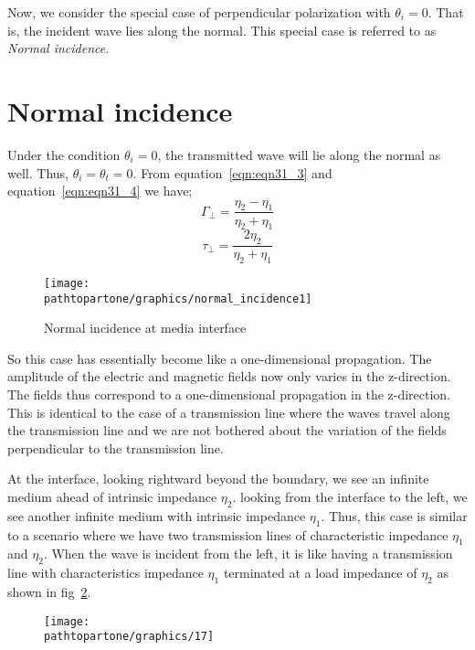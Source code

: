 Now, we consider the special case of perpendicular polarization with  $\theta_{i} = 0$. That is, the incident wave lies along the normal. This special case is referred to as \emph{Normal incidence}.

\section{Normal incidence} 

Under the condition $\theta_{i} = 0$, the transmitted wave will lie along the normal as well. Thus,  $\theta_{i} = \theta_{t} = 0$. From equation~\ref{eqn:eqn31_3} and equation~\ref{eqn:eqn31_4} we have;
\begin{equation}
\Gamma_{\perp} = \frac{\eta_{2} - \eta_{1}}{\eta_{2} + \eta_{1}}
\end{equation}
\begin{equation}
\tau_{\perp} = \frac{2 \eta_{2}}{\eta_{2} + \eta_{1}}
\end{equation}

\begin{figure}[h]
\centering
\texttt{[image: \\pathtopartone/graphics/normal\_incidence1]}
\caption{Normal incidence at media interface}
\label{fig:16}
\end{figure}

So this case has essentially become like a one-dimensional propagation. The amplitude of the electric and magnetic fields now only varies in the z-direction. The fields thus correspond to a one-dimensional propagation in the z-direction. This is identical to the case of a transmission line where the waves travel along the transmission line and we are not bothered about the variation of the fields perpendicular to the transmission line.

At the interface, looking rightward beyond the boundary, we see an infinite medium ahead of intrinsic impedance $\eta_{2}$. looking from the interface to the left, we see another infinite medium with intrinsic impedance $\eta_{1}$. Thus, this case is similar to a scenario where we have two transmission lines of characteristic impedance $\eta_{1}$ and $\eta_{2}$. When the wave is incident from the left, it is like having a transmission line with characteristics impedance  $\eta_{1}$ terminated at a load impedance of  $\eta_{2}$ as shown in fig~\ref{fig:17}.
\begin{figure}[h]
\centering
\texttt{[image: \\pathtopartone/graphics/17]}
\caption{}
\label{fig:17}
\end{figure}

